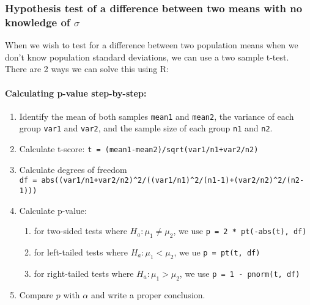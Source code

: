 \hypertarget{hypothesis-test-of-a-difference-between-two-means-with-no-knowledge-of-sigma}{%
\subsubsection{\texorpdfstring{Hypothesis test of a difference between
two means with no knowledge of
\(\sigma\)}{Hypothesis test of a difference between two means with no knowledge of \textbackslash sigma}}\label{hypothesis-test-of-a-difference-between-two-means-with-no-knowledge-of-sigma}}

When we wish to test for a difference between two population means when
we don't know population standard deviations, we can use a two sample
t-test. There are 2 ways we can solve this using R:

\hypertarget{calculating-p-value-step-by-step-1}{%
\paragraph{Calculating p-value
step-by-step:}\label{calculating-p-value-step-by-step-1}}

\begin{enumerate}
\def\labelenumi{\arabic{enumi}.}
\item
  Identify the mean of both samples \texttt{mean1} and \texttt{mean2},
  the variance of each group \texttt{var1} and \texttt{var2}, and the
  sample size of each group \texttt{n1} and \texttt{n2}.
\item
  Calculate t-score: \texttt{t\ =\ (mean1-mean2)/sqrt(var1/n1+var2/n2)}
\item
  Calculate degrees of freedom
  \texttt{df\ =\ abs((var1/n1+var2/n2)\^{}2/((var1/n1)\^{}2/(n1-1)+(var2/n2)\^{}2/(n2-1)))}
\item
  Calculate p-value:

  \begin{enumerate}
  \def\labelenumii{\alph{enumii}.}
  \item
    for two-sided tests where \(H_a: \mu_1 \neq \mu_2\), we use
    \texttt{p\ =\ 2\ *\ pt(-abs(t),\ df)}
  \item
    for left-tailed tests where \(H_a: \mu_1 < \mu_2\), we ue
    \texttt{p\ =\ pt(t,\ df)}
  \item
    for right-tailed tests where \(H_a: \mu_1 > \mu_2\), we use
    \texttt{p\ =\ 1\ -\ pnorm(t,\ df)}
  \end{enumerate}
\item
  Compare \(p\) with \(\alpha\) and write a proper conclusion.
\end{enumerate}

